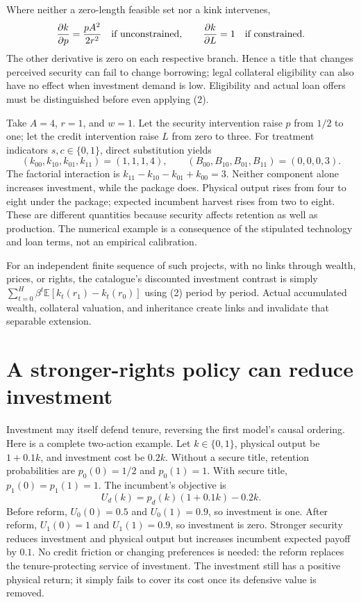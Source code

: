 \documentclass[11pt]{article}
\newcommand{\E}{\mathbb{E}}
\begin{document}
Where neither a zero-length feasible set nor a kink intervenes,
\[
 \frac{\partial k}{\partial p}=\frac{pA^2}{2r^2}
 \quad\hbox{if unconstrained},\qquad
 \frac{\partial k}{\partial L}=1\quad\hbox{if constrained}.
\]
The other derivative is zero on each respective branch. Hence a title that
changes perceived security can fail to change borrowing; legal collateral
eligibility can also have no effect when investment demand is low.
Eligibility and actual loan offers must be distinguished before even
applying (2).

Take $A=4$, $r=1$, and $w=1$. Let the security intervention raise $p$ from
$1/2$ to one; let the credit intervention raise $L$ from zero to three.
For treatment indicators $s,c\in\{0,1\}$, direct substitution yields
\[
 (k_{00},k_{10},k_{01},k_{11})=(1,1,1,4),\qquad
 (B_{00},B_{10},B_{01},B_{11})=(0,0,0,3).
\]
The factorial interaction is $k_{11}-k_{10}-k_{01}+k_{00}=3$.
Neither component alone increases investment, while the package does.
Physical output rises from four to eight under the package; expected
incumbent harvest rises from two to eight. These are different quantities
because security affects retention as well as production. The numerical
example is a consequence of the stipulated technology and loan terms,
not an empirical calibration.

For an independent finite sequence of such projects, with no links through
wealth, prices, or rights, the catalogue's discounted investment contrast
is simply $\sum_{t=0}^H\beta^t\E[k_t(r_1)-k_t(r_0)]$ using (2) period by
period. Actual accumulated wealth, collateral valuation, and inheritance
create links and invalidate that separable extension.

\section{A stronger-rights policy can reduce investment}
Investment may itself defend tenure, reversing the first model's causal
ordering. Here is a complete two-action example. Let $k\in\{0,1\}$,
physical output be $1+0.1k$, and investment cost be $0.2k$. Without a
secure title, retention probabilities are
$p_0(0)=1/2$ and $p_0(1)=1$. With secure title,
$p_1(0)=p_1(1)=1$. The incumbent's objective is
\[
 U_d(k)=p_d(k)(1+0.1k)-0.2k.
\]
Before reform, $U_0(0)=0.5$ and $U_0(1)=0.9$, so investment is one.
After reform, $U_1(0)=1$ and $U_1(1)=0.9$, so investment is zero.
Stronger security reduces investment and physical output but increases
incumbent expected payoff by $0.1$. No credit friction or changing
preferences is needed: the reform replaces the tenure-protecting service
of investment. The investment still has a positive physical return; it
simply fails to cover its cost once its defensive value is removed.
\end{document}

